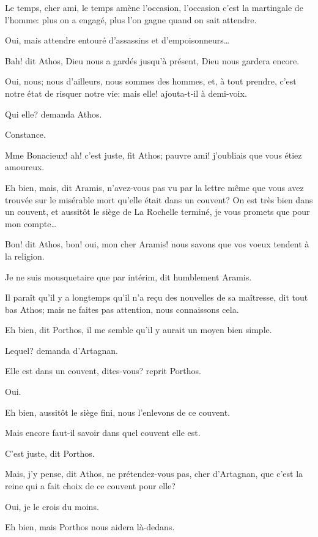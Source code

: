\speak  Le temps, cher ami, le temps amène l'occasion, l'occasion c'est la martingale de l'homme: plus on a engagé, plus l'on gagne quand on sait attendre. 

\speak  Oui, mais attendre entouré d'assassins et d'empoisonneurs\dots 

\speak  Bah! dit Athos, Dieu nous a gardés jusqu'à présent, Dieu nous gardera encore. 

\speak  Oui, nous; nous d'ailleurs, nous sommes des hommes, et, à tout prendre, c'est notre état de risquer notre vie: mais elle! ajouta-t-il à demi-voix. 

\speak  Qui elle? demanda Athos. 

\speak  Constance. 

\speak  Mme Bonacieux! ah! c'est juste, fit Athos; pauvre ami! j'oubliais que vous étiez amoureux. 

\speak  Eh bien, mais, dit Aramis, n'avez-vous pas vu par la lettre même que vous avez trouvée sur le misérable mort qu'elle était dans un couvent? On est très bien dans un couvent, et aussitôt le siège de La Rochelle terminé, je vous promets que pour mon compte\dots 

\speak  Bon! dit Athos, bon! oui, mon cher Aramis! nous savons que vos voeux tendent à la religion. 

\speak  Je ne suis mousquetaire que par intérim, dit humblement Aramis. 

\speak  Il paraît qu'il y a longtemps qu'il n'a reçu des nouvelles de sa maîtresse, dit tout bas Athos; mais ne faites pas attention, nous connaissons cela. 

\speak  Eh bien, dit Porthos, il me semble qu'il y aurait un moyen bien simple. 

\speak  Lequel? demanda d'Artagnan. 

\speak  Elle est dans un couvent, dites-vous? reprit Porthos. 

\speak  Oui. 

\speak  Eh bien, aussitôt le siège fini, nous l'enlevons de ce couvent. 

\speak  Mais encore faut-il savoir dans quel couvent elle est. 

\speak  C'est juste, dit Porthos. 

\speak  Mais, j'y pense, dit Athos, ne prétendez-vous pas, cher d'Artagnan, que c'est la reine qui a fait choix de ce couvent pour elle? 

\speak  Oui, je le crois du moins. 

\speak  Eh bien, mais Porthos nous aidera là-dedans. 

